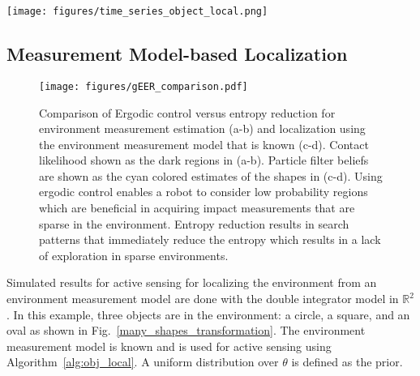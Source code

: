 \documentclass[conference]{IEEEtran}
\begin{document}
\begin{figure*}[ht!]
\centering
\texttt{[image: figures/time\_series\_object\_local.png]}
\caption{
Localization of objects using a given measurement model is illustrated for an environment containing three objects.
The expected information of the measurement model is shown as the distribution in the background of each time frame $t_i$ space $1.25$ seconds apart.
The transparent green objects are the depiction of the current belief of their location $p(\theta)$.
The ground truth object location is shown in black and the robot trajectory in shown as the blue line. 
The robot estimates the transformation using the information of the environment measurement model as a target for active sensing.
We refer the reader to the multimedia \href{https://youtu.be/yKVlo_kE0cw}{video} for an animation of this result using a manifold particle filter~\cite{koval2015pose}.
} 
\label{many_shapes_transformation}
\end{figure*}

\subsection{Measurement Model-based Localization}

\begin{figure}[h!]
\centering
\texttt{[image: figures/gEER\_comparison.pdf]}
\caption{ Comparison of Ergodic control versus entropy reduction for environment measurement estimation (a-b) and localization using the environment measurement model that is known (c-d).
Contact likelihood shown as the dark regions in (a-b).
Particle filter beliefs are shown as the cyan colored estimates of the shapes in (c-d).
Using ergodic control enables a robot to consider low probability regions which are beneficial in acquiring impact measurements that are sparse in the environment. 
Entropy reduction results in search patterns that immediately reduce the entropy which results in a lack of exploration in sparse environments. 
}
\vspace{-5mm}
\label{comparison_gEER}
\end{figure}


Simulated results for active sensing for localizing the environment from an environment measurement model are done with the double integrator model in $\mathbb{R}^2$.
In this example, three objects are in the environment: a circle, a square, and an oval as shown in Fig.~\ref{many_shapes_transformation}.
The environment measurement model is known and is used for active sensing using Algorithm~\ref{alg:obj_local}.
A uniform distribution over $\theta$ is defined as the prior.
\end{document}
